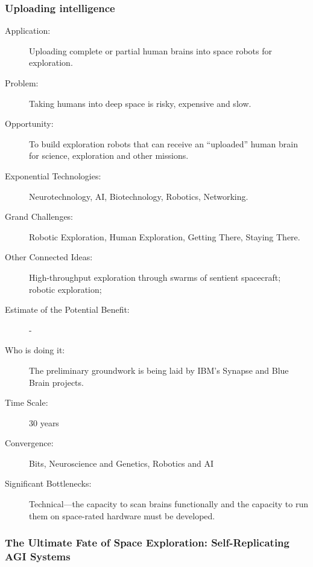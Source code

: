 \subsubsection{Uploading intelligence}
 
\begin{description} \item[Application:] Uploading complete or partial human brains into space robots for exploration.
 
  \item[Problem:] Taking humans into deep space is risky, expensive and slow.
 
  \item[Opportunity:] To build exploration robots that can receive an ``uploaded'' human brain for science, exploration and other missions.
 
  \item[Exponential Technologies:] Neurotechnology, AI, Biotechnology,
Robotics, Networking.
 
  \item[Grand Challenges:] Robotic Exploration, Human Exploration, Getting
There, Staying There.
 
  \item[Other Connected Ideas:] High-throughput exploration through swarms of
sentient spacecraft; robotic exploration;
 
  \item[Estimate of the Potential Benefit:]-
 
  \item[Who is doing it:] The preliminary groundwork is being laid by IBM's Synapse and Blue Brain projects.
 
  \item[Time Scale:] 30 years
 
  \item[Convergence:] Bits, Neuroscience and Genetics, Robotics and AI
 
  \item[Significant Bottlenecks:] Technical---the capacity to scan brains functionally and the capacity to run them on space-rated hardware must be developed.
  \end{description}

 
\subsubsection{The Ultimate Fate of Space Exploration: Self-Replicating AGI Systems}

